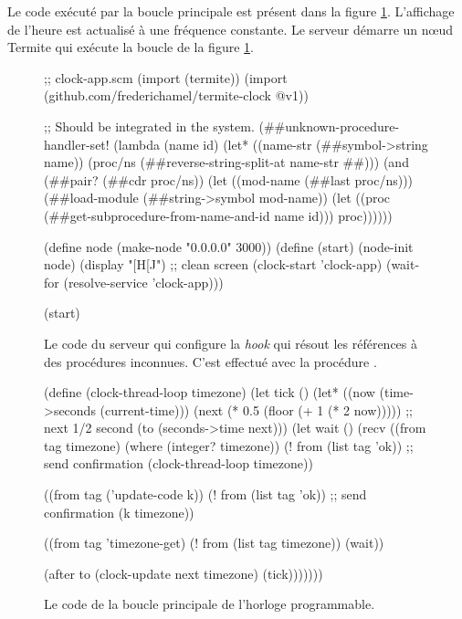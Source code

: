 Le code exécuté par la boucle principale est présent dans la figure
\ref{fig:termite-clock@v1}. L'affichage de l'heure est actualisé à
une fréquence constante. Le serveur démarre un nœud Termite qui
exécute la boucle de la figure \ref{fig:termite-clock@v1}.

\begin{figure}[h!]
\begin{center}
\begin{mplisting}{1}
;; clock-app.scm
(import (termite))
(import (github.com/frederichamel/termite-clock @v1))

;; Should be integrated in the system.
(##unknown-procedure-handler-set!
  (lambda (name id)
    (let* ((name-str (##symbol->string name))
           (proc/ns (##reverse-string-split-at name-str #\#)))
      (and (##pair? (##cdr proc/ns))
           (let ((mod-name (##last proc/ns)))
             (##load-module (##string->symbol mod-name))
             (let ((proc (##get-subprocedure-from-name-and-id name id)))
               proc))))))

(define node (make-node "0.0.0.0" 3000))
(define (start)
  (node-init node)
  (display "[H[J") ;; clean screen
  (clock-start 'clock-app)
  (wait-for (resolve-service 'clock-app)))

(start)
\end{mplisting}
\end{center}
  \caption{Le code du serveur qui configure la \textit{hook}
    qui résout les références à des procédures inconnues.
    C'est effectué avec la procédure .
    }
  \vspace*{4ex}
\end{figure}


\begin{figure}[ht]
  \centering
\begin{mplisting}{1}
(define (clock-thread-loop timezone)
  (let tick ()
    (let* ((now (time->seconds (current-time)))
           (next (* 0.5 (floor (+ 1 (* 2 now))))) ;; next 1/2 second
           (to (seconds->time next)))
      (let wait ()
        (recv
          ((from tag timezone) (where (integer? timezone))
           (! from (list tag 'ok)) ;; send confirmation
           (clock-thread-loop timezone))

          ((from tag ('update-code k))
           (! from (list tag 'ok)) ;; send confirmation
           (k timezone))

          ((from tag 'timezone-get)
           (! from (list tag timezone))
           (wait))

          (after to
           (clock-update next timezone)
           (tick)))))))
\end{mplisting}
  \caption{Le code de la boucle principale de l'horloge programmable.}
  \label{fig:termite-clock@v1}
  \vspace*{4ex}
\end{figure}

